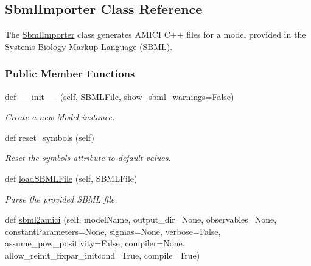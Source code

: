 \hypertarget{classamici_1_1sbml__import_1_1_sbml_importer}{}\subsection{Sbml\+Importer Class Reference}
\label{classamici_1_1sbml__import_1_1_sbml_importer}


The \mbox{\hyperlink{classamici_1_1sbml__import_1_1_sbml_importer}{Sbml\+Importer}} class generates A\+M\+I\+CI C++ files for a model provided in the Systems Biology Markup Language (S\+B\+ML).  


\subsubsection*{Public Member Functions}
\begin{DoxyCompactItemize}
\item 
def \mbox{\hyperlink{classamici_1_1sbml__import_1_1_sbml_importer_a93a0e19925c5c5080bf4b02249e069af}{\+\_\+\+\_\+init\+\_\+\+\_\+}} (self, S\+B\+M\+L\+File, \mbox{\hyperlink{classamici_1_1sbml__import_1_1_sbml_importer_a798e19e1d0ead16356000846afa1c4e0}{show\+\_\+sbml\+\_\+warnings}}=False)
\begin{DoxyCompactList}\small\item\em Create a new \mbox{\hyperlink{classamici_1_1_model}{Model}} instance. \end{DoxyCompactList}\item 
def \mbox{\hyperlink{classamici_1_1sbml__import_1_1_sbml_importer_a17147ce5084526fa003563813c1be230}{reset\+\_\+symbols}} (self)
\begin{DoxyCompactList}\small\item\em Reset the symbols attribute to default values. \end{DoxyCompactList}\item 
def \mbox{\hyperlink{classamici_1_1sbml__import_1_1_sbml_importer_a16147666bbc66b3573fd6d49c4023af1}{load\+S\+B\+M\+L\+File}} (self, S\+B\+M\+L\+File)
\begin{DoxyCompactList}\small\item\em Parse the provided S\+B\+ML file. \end{DoxyCompactList}\item 
def \mbox{\hyperlink{classamici_1_1sbml__import_1_1_sbml_importer_ab02f5c6e1bc803fe8223280ebb555a82}{sbml2amici}} (self, model\+Name, output\+\_\+dir=None, observables=None, constant\+Parameters=None, sigmas=None, verbose=False, assume\+\_\+pow\+\_\+positivity=False, compiler=None, allow\+\_\+reinit\+\_\+fixpar\+\_\+initcond=True, compile=True)

\end{DoxyCompactItemize}
